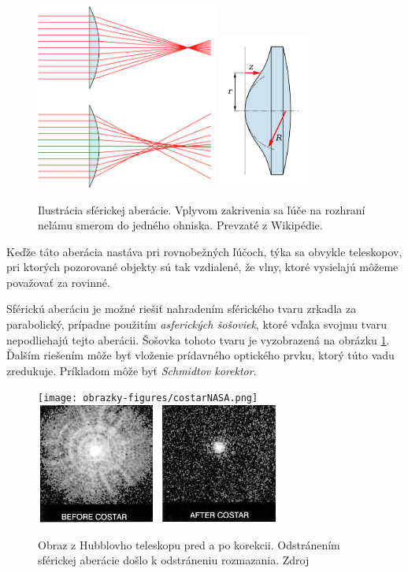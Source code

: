 \begin{figure}[h]
\centering
\label{saill}
\includegraphics[width=6cm]{obrazky-figures/sphericalAberrationWikipedia.png}
\includegraphics[width=3cm]{obrazky-figures/asphericLen.png}
\caption{Ilustrácia sférickej aberácie. Vplyvom zakrivenia sa ľúče na rozhraní nelámu smerom
    do jedného ohniska. Prevzaté z Wikipédie\cite{sphericalAberrationWiki}.}
\end{figure}

Keďže táto aberácia nastáva pri rovnobežných ľúčoch, týka sa obvykle teleskopov, pri ktorých
pozorované objekty sú tak vzdialené, že vlny, ktoré vysielajú môžeme považovať za rovinné.

Sférickú aberáciu je možné riešiť nahradením sférického tvaru zrkadla za parabolický,
prípadne použitím \textit{asferických šošoviek}, ktoré vďaka svojmu tvaru nepodliehajú tejto
aberácii. Šošovka tohoto tvaru je vyzobrazená na obrázku \ref{saill}. Ďalším riešením
môže byť vloženie prídavného optického prvku, ktorý túto vadu zredukuje. Príkladom môže
byť \textit{Schmidtov korektor}.

\begin{figure}
    \centering
    \texttt{[image: obrazky-figures/costarNASA.png]}
    \includegraphics[scale=0.6]{obrazky-figures/cosar.png}
    \caption{Obraz z Hubblovho teleskopu pred a po korekcii. Odstránením sférickej aberácie došlo k
    odstráneniu rozmazania. Zdroj\cite{nasaHubble}}
    \label{hubbleImage}
\end{figure}


